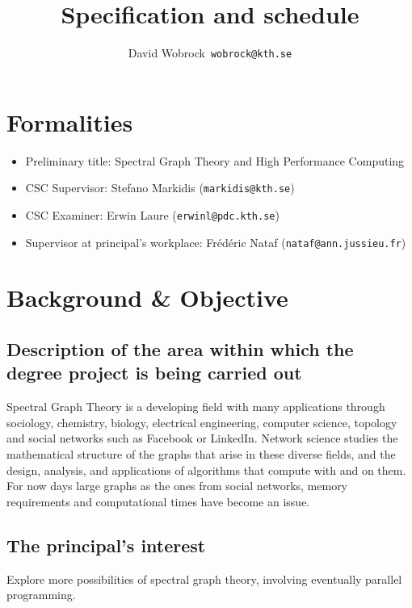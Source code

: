 \documentclass[12pt]{article}
\begin{document}
\title{Specification and schedule}
\author{David Wobrock\ \texttt{wobrock@kth.se}}

\maketitle

\section*{Formalities}

\begin{itemize}
 \item Preliminary title: Spectral Graph Theory and High Performance Computing
 \item CSC Supervisor: Stefano Markidis (\texttt{markidis@kth.se})
 \item CSC Examiner: Erwin Laure (\texttt{erwinl@pdc.kth.se})
 \item Supervisor at principal's workplace: Fr\'{e}d\'{e}ric Nataf (\texttt{nataf@ann.jussieu.fr})
\end{itemize}

\section*{Background \& Objective}

\subsection*{Description of the area within which the degree project is being carried out}

Spectral Graph Theory is a developing field with many applications through sociology, chemistry, biology, electrical engineering, computer science, topology and social networks such as Facebook or LinkedIn.
Network science studies the mathematical structure of the graphs that arise in these diverse fields, and the design, analysis, and applications of algorithms that compute with and on them.
For now days large graphs as the ones from social networks, memory requirements and computational times have become an issue.

\subsection*{The principal's interest}

Explore more possibilities of spectral graph theory, involving eventually parallel programming.
\end{document}
